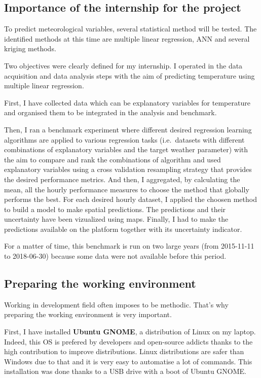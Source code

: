 \documentclass[12pt,twoside]{reedthesis}
\theoremstyle{definition}
\theoremstyle{definition}
\theoremstyle{definition}
\theoremstyle{remark}
\begin{document}
\subsection{Importance of the internship for the
project}\label{importance-of-the-internship-for-the-project}

To predict meteorological variables, several statistical method will be
tested. The identified methods at this time are multiple linear
regression, ANN and several kriging methods.

Two objectives were clearly defined for my internship. I operated in the
data acquisition and data analysis steps with the aim of predicting
temperature using multiple linear regression.

First, I have collected data which can be explanatory variables for
temperature and organised them to be integrated in the analysis and
benchmark.

Then, I ran a benchmark experiment where different desired regression
learning algorithms are applied to various regression tasks
(i.e.~datasets with different combinations of explanatory variables and
the target weather parameter) with the aim to compare and rank the
combinations of algorithm and used explanatory variables using a cross
validation resampling strategy that provides the desired performance
metrics. And then, I aggregated, by calculating the mean, all the hourly
performance measures to choose the method that globally performs the
best. For each desired hourly dataset, I applied the choosen method to
build a model to make spatial predictions. The predictions and their
uncertainty have been vizualized using maps. Finally, I had to make the
predictions available on the platform together with its uncertainty
indicator.

For a matter of time, this benchmark is run on two large years (from
2015-11-11 to 2018-06-30) because some data were not available before
this period.

\subsection{Preparing the working
environment}\label{preparing-the-working-environment}

Working in development field often imposes to be methodic. That's why
preparing the working environment is very important.

First, I have installed \textbf{Ubuntu GNOME}, a distribution of Linux
on my laptop. Indeed, this OS is prefered by developers and open-source
addicts thanks to the high contribution to improve distributions. Linux
distributions are safer than Windows due to that and it is very easy to
automatise a lot of commands. This installation was done thanks to a USB
drive with a boot of Ubuntu GNOME.
\end{document}
